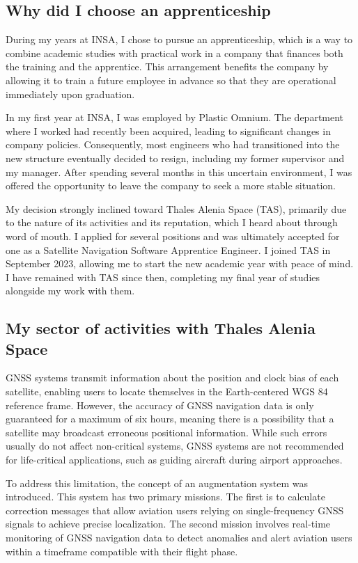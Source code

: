 \subsection{Why did I choose an apprenticeship}

During my years at INSA, I chose to pursue an apprenticeship, which is a way to combine academic studies with practical work in a company that finances both the training and the apprentice. This arrangement benefits the company by allowing it to train a future employee in advance so that they are operational immediately upon graduation.

In my first year at INSA, I was employed by Plastic Omnium. The department where I worked had recently been acquired, leading to significant changes in company policies. Consequently, most engineers who had transitioned into the new structure eventually decided to resign, including my former supervisor and my manager. After spending several months in this uncertain environment, I was offered the opportunity to leave the company to seek a more stable situation.

My decision strongly inclined toward Thales Alenia Space (TAS), primarily due to the nature of its activities and its reputation, which I heard about through word of mouth. I applied for several positions and was ultimately accepted for one as a Satellite Navigation Software Apprentice Engineer. I joined TAS in September 2023, allowing me to start the new academic year with peace of mind. I have remained with TAS since then, completing my final year of studies alongside my work with them.

\subsection{My sector of activities with Thales Alenia Space}

GNSS systems transmit information about the position and clock bias of each satellite, enabling users to locate themselves in the Earth-centered WGS 84 reference frame. However, the accuracy of GNSS navigation data is only guaranteed for a maximum of six hours, meaning there is a possibility that a satellite may broadcast erroneous positional information. While such errors usually do not affect non-critical systems, GNSS systems are not recommended for life-critical applications, such as guiding aircraft during airport approaches.

To address this limitation, the concept of an augmentation system was introduced. This system has two primary missions. The first is to calculate correction messages that allow aviation users relying on single-frequency GNSS signals to achieve precise localization. The second mission involves real-time monitoring of GNSS navigation data to detect anomalies and alert aviation users within a timeframe compatible with their flight phase.


